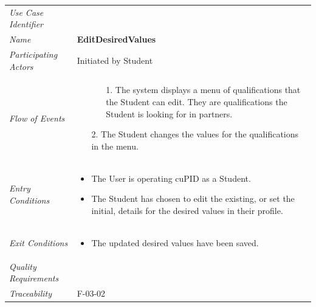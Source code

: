 \documentclass[12pt,letterpaper]{article}
\begin{document}
\begin{center}
	\begin{tabu} to 
		\toprule
		Use Case Identifier & \editdesiredvalues{} \\
		Name & {\bf EditDesiredValues} \\
		Participating Actors & Initiated by Student \\
		Flow of Events & 
		\begin{minipage}[t]{\linewidth}
		    \begin{enumerate}
		        \item[]
		        \begin{enumerate}
				    \item[1.] The system displays a menu of qualifications that the Student can edit. They are qualifications the Student is looking for in partners.
		        \end{enumerate}
	            \item[2.] The Student changes the values for the qualifications in the menu.
			\end{enumerate}
		\end{minipage} \\

		Entry Conditions &
		\begin{minipage}[t]{\linewidth}
			\begin{itemize}
			    \item The User is operating cuPID as a Student.
			    \item The Student has chosen to edit the existing, or set the initial, details for the desired values in their profile.
	        \end{itemize}
		\end{minipage} \\

		Exit Conditions &
		\begin{minipage}[t]{\linewidth}
			\begin{itemize}
			    \item The updated desired values have been saved.
	        \end{itemize}
		\end{minipage} \\

		Quality Requirements & \\

		Traceability &  F-03-02\\
		\toprule
	\end{tabu}
\end{center}
\end{document}
